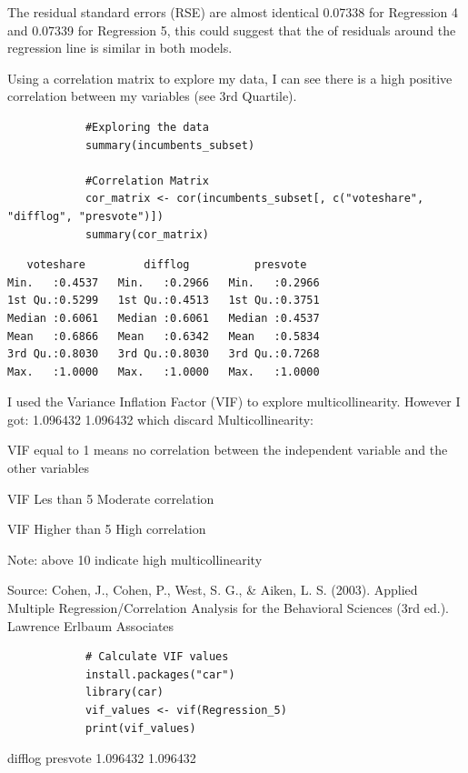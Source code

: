 \documentclass[12pt,letterpaper]{article}
\begin{document}
\begin{enumerate}
		The residual standard errors (RSE) are almost identical 0.07338 for Regression 4 and 0.07339 for Regression 5, this could suggest that the of residuals around the regression line is similar in both models.
		
		Using a correlation matrix to explore my data, I can see there is a high positive correlation between my variables (see 3rd Quartile). 
		
		\begin{lstlisting}
			#Exploring the data
			summary(incumbents_subset)
			
			#Correlation Matrix
			cor_matrix <- cor(incumbents_subset[, c("voteshare", "difflog", "presvote")])
			summary(cor_matrix)
		\end{lstlisting}
		
		\begin{verbatim}
   voteshare         difflog          presvote     
Min.   :0.4537   Min.   :0.2966   Min.   :0.2966  
1st Qu.:0.5299   1st Qu.:0.4513   1st Qu.:0.3751  
Median :0.6061   Median :0.6061   Median :0.4537  
Mean   :0.6866   Mean   :0.6342   Mean   :0.5834  
3rd Qu.:0.8030   3rd Qu.:0.8030   3rd Qu.:0.7268  
Max.   :1.0000   Max.   :1.0000   Max.   :1.0000

		\end{verbatim}
		
		I used the Variance Inflation Factor (VIF) to explore multicollinearity. However I got: 1.096432 1.096432 which discard Multicollinearity:
		
		VIF equal to 1 means no correlation between the independent variable and the other variables
		
		VIF Les than 5 Moderate correlation 
		
		VIF Higher than 5 High correlation 
		
		Note: above 10 indicate high multicollinearity
		
		Source: Cohen, J., Cohen, P., West, S. G., & Aiken, L. S. (2003). Applied Multiple Regression/Correlation Analysis for the Behavioral Sciences (3rd ed.). Lawrence Erlbaum Associates
		
		\begin{lstlisting}	
			# Calculate VIF values
			install.packages("car")
			library(car)
			vif_values <- vif(Regression_5)
			print(vif_values)
		\end{lstlisting}
		
		 difflog presvote 
		1.096432 1.096432 
		
	\end{enumerate}
\end{document}
